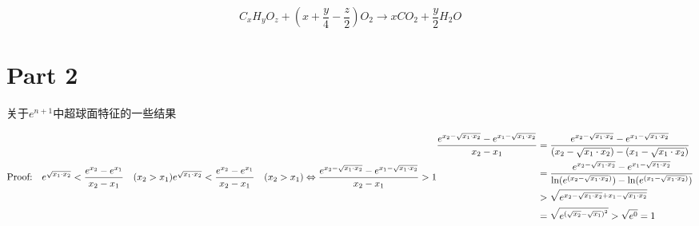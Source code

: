 \documentclass[UTF8]{article}
\begin{document}
$$
{C_xH_yO_z +(x +\frac y4-\frac z2)O_2\rightarrow xCO_2+\frac y2H_2O}
$$


\section{Part 2}
关于$e^{n+1}$中超球面特征的一些结果 \cite{Wen}

$$
\text{Proof:}\quad{e^{\sqrt {{x_1} \cdot {x_2}} }} < \frac{{{e^{{x_2}}} - {e^{{x_1}}}}}{{{x_2} - {x_1}}}
\quad({x_2} > {x_1})~\\
{e^{\sqrt {{x_1} \cdot {x_2}} }} < \frac{{{e^{{x_2}}} - {e^{{x_1}}}}}{{{x_2} - {x_1}}}
\quad({x_2} > {x_1})
\Leftrightarrow 
\frac{{{e^{{x_2} - \sqrt {{x_1} \cdot {x_2}} }} - {e^{{x_1} - \sqrt {{x_1} \cdot {x_2}} }}}}{{{x_2} - {x_1}}} > 1~\\
\begin{align}
\frac{{{e^{{x_2} - \sqrt {{x_1} \cdot {x_2}} }} - {e^{{x_1} - \sqrt {{x_1} \cdot {x_2}} }}}}{{{x_2} - {x_1}}}&=\frac{{{e^{{x_2} - \sqrt {{x_1} \cdot {x_2}} }} - {e^{{x_1} - \sqrt {{x_1} \cdot {x_2}} }}}}{{({x_2} - \sqrt {{x_1} \cdot {x_2}} ) - ({x_1} - \sqrt {{x_1} \cdot {x_2}} )}}\\
&=\frac{{{e^{{x_2} - \sqrt {{x_1} \cdot {x_2}} }} - {e^{{x_1} - \sqrt {{x_1} \cdot {x_2}} }}}}{{\ln ({e^{({x_2} - \sqrt {{x_1} \cdot {x_2}} )}}) - \ln ({e^{({x_1} - \sqrt {{x_1} \cdot {x_2}} )}})}}\\
&>\sqrt {{e^{{x_2} - \sqrt {{x_1} \cdot {x_2}}  + {x_1} - \sqrt {{x_1} \cdot {x_2}} }}}\\
&=\sqrt {{e^{{{(\sqrt {{x_2}}  - \sqrt {{x_1}} )}^2}}}}>\sqrt {e^0}=1
\end{align}
$$




\end{document}
